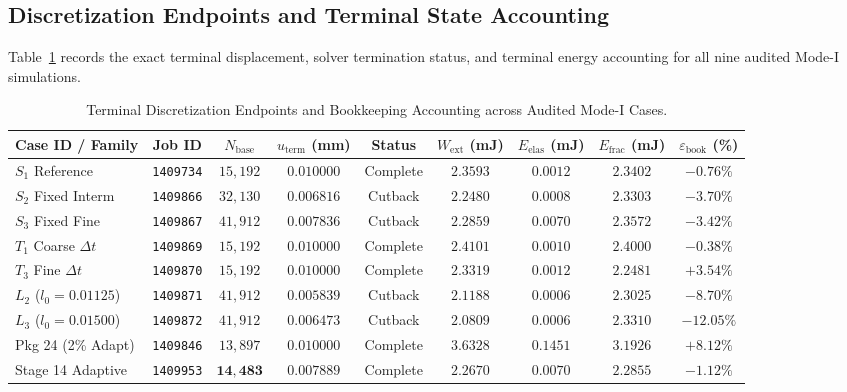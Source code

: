 \subsection{Discretization Endpoints and Terminal State Accounting}
\label{subsec:stage14uw_terminal_accounting}

Table~\ref{tab:stage14uw_terminal_endpoints} records the exact terminal displacement, solver termination status, and terminal energy accounting for all nine audited Mode-I simulations.

\begin{table}[htbp]
\centering
\footnotesize
\setlength{\tabcolsep}{2.5pt}
\caption{Terminal Discretization Endpoints and Bookkeeping Accounting across Audited Mode-I Cases.}
\label{tab:stage14uw_terminal_endpoints}
\begin{tabularx}{\textwidth}{l c c c c c c c c}
\toprule
\textbf{Case ID / Family} & \textbf{Job ID} & $N_{\mathrm{base}}$ & $u_{\mathrm{term}}$ (mm) & \textbf{Status} & $W_{\mathrm{ext}}$ (mJ) & $E_{\mathrm{elas}}$ (mJ) & $E_{\mathrm{frac}}$ (mJ) & $\varepsilon_{\mathrm{book}}$ (\%) \\
\midrule
$S_1$ Reference & \texttt{1409734} & $15{,}192$ & $0.010000$ & Complete & $2.3593$ & $0.0012$ & $2.3402$ & $-0.76\%$ \\
$S_2$ Fixed Interm & \texttt{1409866} & $32{,}130$ & $0.006816$ & Cutback & $2.2480$ & $0.0008$ & $2.3303$ & $-3.70\%$ \\
$S_3$ Fixed Fine & \texttt{1409867} & $41{,}912$ & $0.007836$ & Cutback & $2.2859$ & $0.0070$ & $2.3572$ & $-3.42\%$ \\
\midrule
$T_1$ Coarse $\Delta t$ & \texttt{1409869} & $15{,}192$ & $0.010000$ & Complete & $2.4101$ & $0.0010$ & $2.4000$ & $-0.38\%$ \\
$T_3$ Fine $\Delta t$ & \texttt{1409870} & $15{,}192$ & $0.010000$ & Complete & $2.3319$ & $0.0012$ & $2.2481$ & $+3.54\%$ \\
\midrule
$L_2$ ($l_0=0.01125$) & \texttt{1409871} & $41{,}912$ & $0.005839$ & Cutback & $2.1188$ & $0.0006$ & $2.3025$ & $-8.70\%$ \\
$L_3$ ($l_0=0.01500$) & \texttt{1409872} & $41{,}912$ & $0.006473$ & Cutback & $2.0809$ & $0.0006$ & $2.3310$ & $-12.05\%$ \\
\midrule
Pkg 24 (2\% Adapt) & \texttt{1409846} & $13{,}897$ & $0.010000$ & Complete & $3.6328$ & $0.1451$ & $3.1926$ & $+8.12\%$ \\
Stage 14 Adaptive & \texttt{1409953} & $\mathbf{14{,}483}$ & $\mathbf{0.007889}$ & Complete & $\mathbf{2.2670}$ & $\mathbf{0.0070}$ & $\mathbf{2.2855}$ & $\mathbf{-1.12\%}$ \\
\bottomrule
\end{tabularx}
\end{table}

